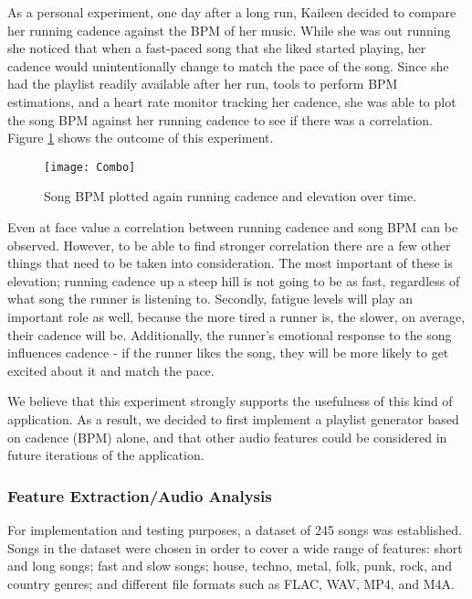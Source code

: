 \documentclass{article}
\begin{document}
As a personal experiment, one day after a long run, Kaileen decided to compare her running cadence against the BPM of her music. While she was out running she noticed that when a fast-paced song that she liked started playing, her cadence would unintentionally change to match the pace of the song. Since she had the playlist readily available after her run, tools to perform BPM estimations, and a heart rate monitor tracking her cadence, she was able to plot the song BPM against her running cadence to see if there was a correlation. Figure \ref{fig:workout} shows the outcome of this experiment.

\begin{figure}[h]
\centering
\captionsetup{justification=centering}
\texttt{[image: Combo]}
\caption{Song BPM plotted again running cadence and elevation over time.}
\label{fig:workout}
\end{figure}

Even at face value a correlation between running cadence and song BPM can be observed. However, to be able to find stronger correlation there are a few other things that need to be taken into consideration. The most important of these is elevation; running cadence up a steep hill is not going to be as fast, regardless of what song the runner is listening to. Secondly, fatigue levels will play an important role as well, because the more tired a runner is, the slower, on average, their cadence will be. Additionally, the runner's emotional response to the song influences cadence - if the runner likes the song, they will be more likely to get excited about it and match the pace.

We believe that this experiment strongly supports the usefulness of this kind of application. As a result, we decided to first implement a playlist generator based on cadence (BPM) alone, and that other audio features could be considered in future iterations of the application.

\subsubsection{Feature Extraction/Audio Analysis}

For implementation and testing purposes, a dataset of 245 songs was established. Songs in the dataset were chosen in order to cover a wide range of features: short and long songs; fast and slow songs; house, techno, metal, folk, punk, rock, and country genres; and different file formats such as FLAC, WAV, MP4, and M4A.
\end{document}
